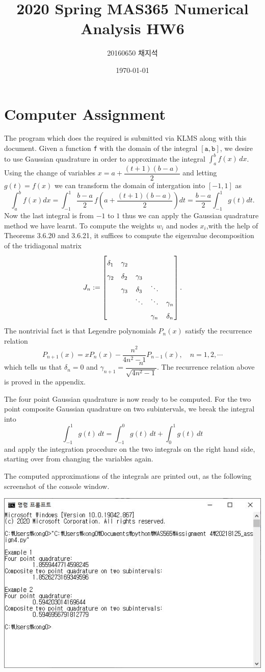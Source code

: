 \documentclass{article}
\title{2020 Spring MAS365 Numerical Analysis HW6}
\author{20160650 채지석}
\date{\today}
\begin{document}
\section*{Computer Assignment}
The program which does the required is submitted via KLMS along with this document. Given a function \texttt{f} with the domain of the integral $[\texttt{a}, \texttt{b}]$, we desire to use Gaussian quadrature in order to approximate the integral $\displaystyle{\int_{a}^b f(x)\, dx}$. Using the change of variables $x = a+\dfrac{(t+1)(b-a)}2$ and letting $g(t) = f(x)$ we can transform the domain of intergation into $[-1,1]$ as \[ 
\int_a^b f(x) dx = \int_{-1}^1 \frac{b-a}2\, f\left( a+\dfrac{(t+1)(b-a)}2  \right) dt = \frac{b-a}2 \int_{-1}^1 g(t) dt. 
\]
Now the last integral is from $-1$ to $1$ thus we can apply the Gaussian quadrature method we have learnt. To compute the weights $w_i$ and nodes $x_i$,with the help of Theorems 3.6.20 and 3.6.21, it suffices to compute the eigenvalue decomposition of the tridiagonal matrix \[
J_n := \begin{bmatrix}
  \delta_1 & \gamma_2 &          &          & \phantom{\ddots}         \\
  \gamma_2 & \delta_2 & \gamma_3 &          & \phantom{\ddots}         \\
           & \gamma_3 & \delta_3 & \ddots   &          \\
           &          & \ddots   & \ddots   & \gamma_n \\
           &          &          & \gamma_n & \delta_n \vphantom{\ddots}
\end{bmatrix}.  
\] The nontrivial fact is that Legendre polynomials $P_n(x)$ satisfy the recurrence relation \[
P_{n+1}(x) = xP_n(x) - \frac{n^2}{4n^2-1}P_{n-1}(x), \quad n=1, 2, \cdots  
\] which tells us that $\delta_n = 0$ and $\gamma_{n+1} = \dfrac{n}{\sqrt{4n^2-1}}$. The recurrence relation above is proved in the appendix. \par 
The four point Gaussian quadrature is now ready to be computed. For the two point composite Gaussian quadrature on two subintervals, we break the integral into \[
\int_{-1}^1 g(t)\, dt = \int_{-1}^0 g(t)\, dt + \int_0^1 g(t)\, dt  
\] and apply the integration procedure on the two integrals on the right hand side, starting over from changing the variables again. \par 
The computed approximations of the integrals are printed out, as the following screenshot of the console window. 
\begin{center}
    \includegraphics[width=0.8\linewidth]{console.JPG}
\end{center}
\end{document}
